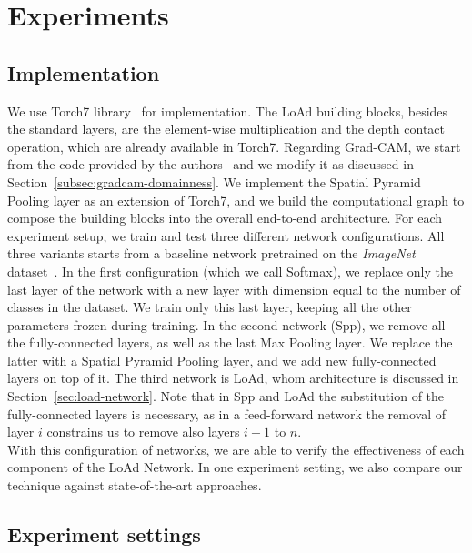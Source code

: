 \documentclass[../main.tex]{subfiles}
\begin{document}
    \chapter{Experiments}\label{chap:experiments}

    \section{Implementation}\label{sec:implementation}
    We use Torch7 library~\cite{torch7} for implementation. The LoAd building blocks, besides the standard layers, are the
    element-wise multiplication and the depth contact operation, which are already available in Torch7.
    Regarding Grad-CAM, we start from the code provided by the authors~\cite{gradcam-github} and we modify it as discussed
    in Section~\ref{subsec:gradcam-domainness}.
    We implement the Spatial Pyramid Pooling layer as an extension of Torch7, and we build the computational graph to compose
    the building blocks into the overall end-to-end architecture.
    \newline\newline
    For each experiment setup, we train and test three different network configurations. All three variants starts from a baseline network pretrained on
    the \textit{ImageNet} dataset~\cite{imagenet}.
    In the first configuration (which we call Softmax), we replace only the last layer of the network with a new layer
    with dimension equal to the number of classes in the dataset. We train only this last layer, keeping all the other parameters frozen during training.
    In the second network (Spp), we remove all the fully-connected layers, as well as the last Max Pooling layer.
    We replace the latter with a Spatial Pyramid Pooling layer, and we add new fully-connected layers on top of it.
    The third network is LoAd, whom architecture is discussed in Section~\ref{sec:load-network}. Note that in Spp and LoAd the substitution of
    the fully-connected layers is necessary, as in a feed-forward network the removal of layer $i$ constrains us to remove also layers $i + 1$ to $n$.
    \\
    With this configuration of networks, we are able to verify the
    effectiveness of each component of the LoAd Network. In one experiment setting, we also compare our technique
    against state-of-the-art approaches.

    \section{Experiment settings}
\end{document}
